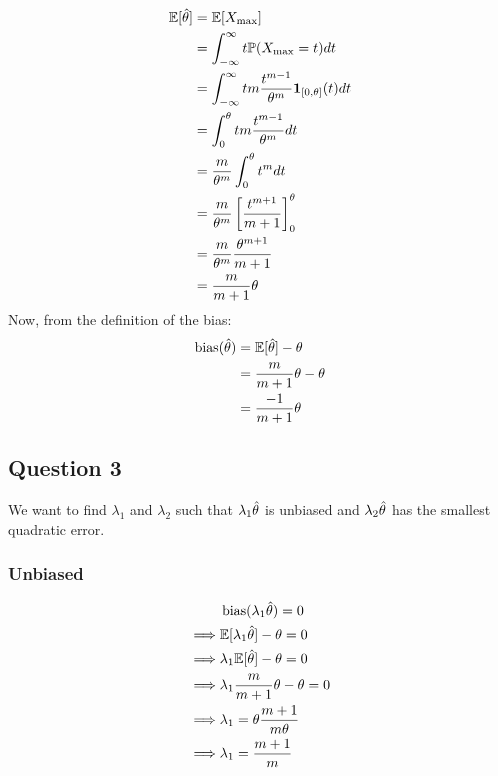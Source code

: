 \documentclass[12pt]{article}
\begin{document}
\begin{align*}
    \mathbb{E}[\hat{\theta}]
     & = \mathbb{E}[X_{\max}]                                                                \\
     & = \int_{-\infty}^{\infty} t \mathbb{P}(X_{\max} = t) dt                               \\
     & = \int_{-\infty}^{\infty} t m \frac{t^{m-1}}{\theta^m} \mathbf{1}_{[0, \theta]}(t) dt \\
     & = \int_{0}^{\theta} t m \frac{t^{m-1}}{\theta^m} dt                           \\
     & = \frac{m}{\theta^m} \int_{0}^{\theta} t^m dt                                 \\
     & = \frac{m}{\theta^m} \left[\frac{t^{m+1}}{m+1} \right]_{0}^{\theta}           \\
     & = \frac{m}{\theta^m} \frac{\theta^{m+1}}{m+1}                                 \\
     & = \frac{m}{m+1} \theta                                                        \\
\end{align*}
Now, from the definition of the bias:
\begin{align*}
    \operatorname{bias}(\hat{\theta})
     & = \mathbb{E}[\hat{\theta}] - \theta        \\
     & = \frac{m}{m+1} \theta - \theta \\
     & = \frac{-1}{m+1} \theta         \\
\end{align*}


\subsection{Question 3}
We want to find \(\lambda_1\) and \(\lambda_2\) such that \(\lambda_1 \hat{\theta}\) is unbiased and \(\lambda_2 \hat{\theta}\) has the smallest quadratic error.
\subsubsection{Unbiased}
\begin{align*}
             &
    \operatorname{bias}(\lambda_1 \hat{\theta}) = 0              \\
    \implies &
    \mathbb{E}[\lambda_1 \hat{\theta}] - \theta = 0        \\
    \implies &
    \lambda_1 \mathbb{E}[\hat{\theta}] - \theta = 0        \\
    \implies &
    \lambda_1 \frac{m}{m+1} \theta - \theta = 0 \\
    \implies &
    \lambda_1 = \theta \frac{m+1}{m \theta}     \\
    \implies &
    \lambda_1 = \frac{m+1}{m}                   \\
\end{align*}
\end{document}
